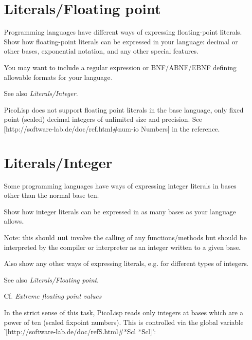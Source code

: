 \begin{itemize}
\begin{wideverbatim}
\end{wideverbatim}

\pagebreak{}
\section*{Literals/Floating point}

Programming languages have different ways of expressing floating-point
literals. Show how floating-point literals can be expressed in your
language: decimal or other bases, exponential notation, and any other
special features.

You may want to include a regular expression or BNF/ABNF/EBNF defining
allowable formats for your language.

See also \emph{Literals/Integer}.

\begin{wideverbatim}

PicoLisp does not support floating point literals in the base language, only
fixed point (scaled) decimal integers of unlimited size and precision. See
[http://software-lab.de/doc/ref.html#num-io Numbers] in the reference.

\end{wideverbatim}

\pagebreak{}
\section*{Literals/Integer}

Some programming languages have ways of expressing integer literals in
bases other than the normal base ten.

Show how integer literals can be expressed in as many bases as your
language allows.

Note: this should \textbf{not} involve the calling of any
functions/methods but should be interpreted by the compiler or
interpreter as an integer written to a given base.

Also show any other ways of expressing literals, e.g. for different
types of integers.

See also \emph{Literals/Floating point}.

Cf. \emph{Extreme floating point
values}

\begin{wideverbatim}

In the strict sense of this task, PicoLisp reads only integers at bases which
are a power of ten (scaled fixpoint numbers). This is controlled via the global
variable '[http://software-lab.de/doc/refS.html#*Scl *Scl]':


\end{wideverbatim}
\end{itemize}
